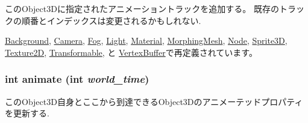 このObject3Dに指定されたアニメーショントラックを追加する。 既存のトラックの順番とインデックスは変更されるかもしれない. 

\hyperlink{classm3g_1_1Background_415c0b110f95410ded9b85e5d99a496b}{Background}, \hyperlink{classm3g_1_1Camera_415c0b110f95410ded9b85e5d99a496b}{Camera}, \hyperlink{classm3g_1_1Fog_415c0b110f95410ded9b85e5d99a496b}{Fog}, \hyperlink{classm3g_1_1Light_415c0b110f95410ded9b85e5d99a496b}{Light}, \hyperlink{classm3g_1_1Material_415c0b110f95410ded9b85e5d99a496b}{Material}, \hyperlink{classm3g_1_1MorphingMesh_415c0b110f95410ded9b85e5d99a496b}{MorphingMesh}, \hyperlink{classm3g_1_1Node_415c0b110f95410ded9b85e5d99a496b}{Node}, \hyperlink{classm3g_1_1Sprite3D_415c0b110f95410ded9b85e5d99a496b}{Sprite3D}, \hyperlink{classm3g_1_1Texture2D_415c0b110f95410ded9b85e5d99a496b}{Texture2D}, \hyperlink{classm3g_1_1Transformable_415c0b110f95410ded9b85e5d99a496b}{Transformable}, と \hyperlink{classm3g_1_1VertexBuffer_415c0b110f95410ded9b85e5d99a496b}{VertexBuffer}で再定義されています。\hypertarget{classm3g_1_1Object3D_8aad1ceab4c2a03609c8a42324ce484d}{
\subsubsection[{animate}]{\setlength{\rightskip}{0pt plus 5cm}int animate (int {\em world\_\-time})}}
\label{classm3g_1_1Object3D_8aad1ceab4c2a03609c8a42324ce484d}


このObject3D自身とここから到達できるObject3Dのアニメーテッドプロパティを更新する. 

